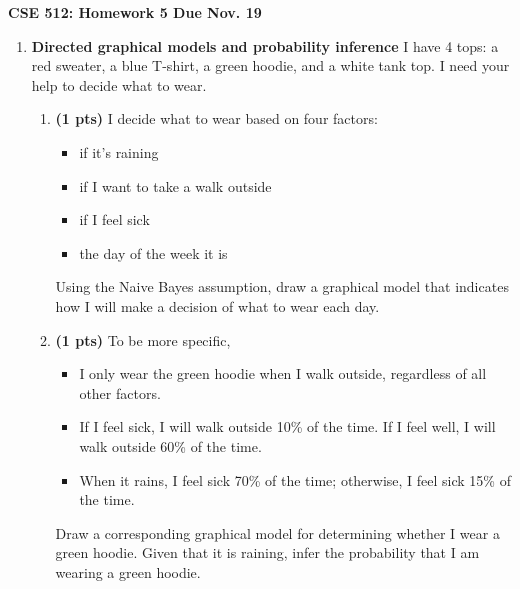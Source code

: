 \documentclass{article}
\newcommand{\mypagebreak}{\begin{center}
		\noindent\makebox[\linewidth]{\rule{7.5in}{1pt}}
	\end{center}}
\newcommand{\showpoints}[1]{\textbf{(#1 pts)} }
\begin{document}
{\Large\textbf{CSE 512: Homework 5 \hfill
Due Nov. 19}}


\mypagebreak


\begin{enumerate}


\item \textbf{Directed graphical models and probability inference}
I have 4 tops: a red sweater, a blue T-shirt, a green hoodie, and a white tank top.
I need your help to decide what to wear.

\begin{enumerate}

\item \showpoints{1}  I decide what to wear based on four factors:
\begin{itemize}
\item if it's raining
\item if I want to take a walk outside
\item if I feel sick
\item the day of the week it is
\end{itemize}


Using the Naive Bayes assumption, draw a graphical model that indicates how I will make a decision of what to wear each day.


\item \showpoints{1}  To be more specific, 
\begin{itemize}
\item I only wear the green hoodie when I walk outside, regardless of all other factors. 
\item If I feel sick, I will walk outside 10\% of the time. If I feel well, I will walk outside 60\% of the time.
\item When it rains, I feel sick 70\% of the time; otherwise, I feel sick 15\% of the time.
\end{itemize}
Draw a corresponding graphical model for determining whether I wear a green hoodie. Given that it is raining, infer the probability that I am wearing a green hoodie.






\end{enumerate}
\end{enumerate}
\end{document}
